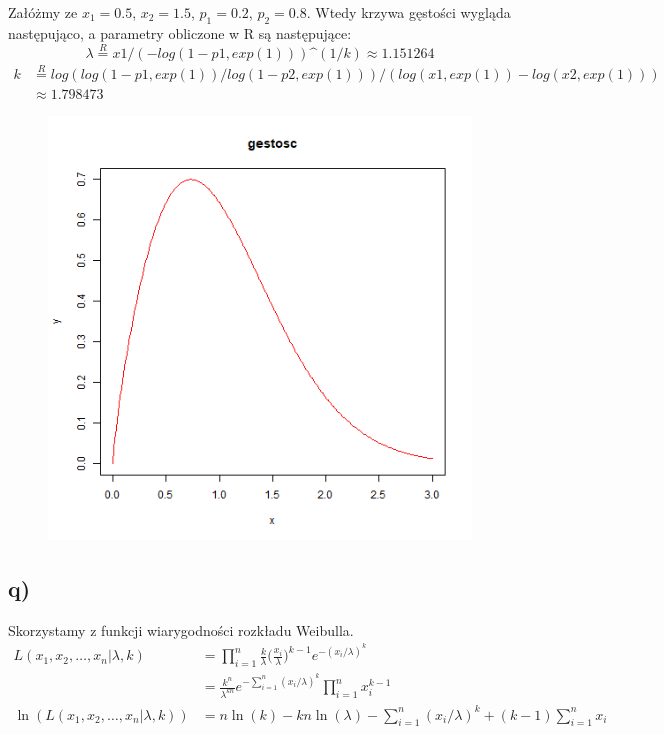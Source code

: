 \documentclass{article}
\begin{document}
Załóżmy ze $x_1 = 0.5$, $x_2 = 1.5$, $p_1 = 0.2$, $p_2 = 0.8$. Wtedy krzywa gęstości wygląda następująco, a parametry obliczone w R są następujące:\\
\[ \lambda \overset{R}{=} x1 / (-log(1-p1, exp(1)))\text{\textasciicircum}(1/k) \approx 1.151264 \]
\begin{align*}
k & \overset{R}{=} log(log(1-p1, exp(1)) / log(1-p2, exp(1)))/ (log(x1,exp(1)) - log(x2,exp(1))) \\
& \approx 1.798473
\end{align*}
\begin{figure}[h!]
\begin{center}
\includegraphics[height=0.5\textheight, angle=0]{"kolosW.png"}
\end{center}
\end{figure}

\newpage
\subsection{q)}
Skorzystamy z funkcji wiarygodności rozkładu Weibulla.
\begin{align*}
L(x_1,x_2,\dots,x_n|\lambda,k) & = \prod_{i=1}^n \frac{k}{\lambda} \Big( \frac{x_i}{\lambda} \Big) ^{k-1} e^{-(x_i/\lambda)^k} \\
& = \frac{k^n}{\lambda^{kn}} e^{-\sum_{i=1}^n(x_i/\lambda)^k} \prod_{i=1}^n x_i^{k-1} \\
\ln(L(x_1,x_2,\dots,x_n|\lambda,k)) & = n \ln(k) - kn\ln(\lambda) - \sum_{i=1}^n(x_i/\lambda)^k + (k-1) \sum_{i=1}^n x_i
\end{align*}
\end{document}
